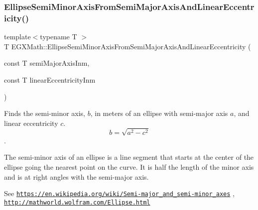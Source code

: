 \mbox{\label{group___e_g_x_math-_geometry-2_d-_ellipse-_semi_minor_axis_ga001beab4a083da9dd00dace28e749284}} 
\subsubsection{\texorpdfstring{Ellipse\+Semi\+Minor\+Axis\+From\+Semi\+Major\+Axis\+And\+Linear\+Eccentricity()}{EllipseSemiMinorAxisFromSemiMajorAxisAndLinearEccentricity()}}
{\footnotesize\ttfamily template$<$typename T $>$ \\
T E\+G\+X\+Math\+::\+Ellipse\+Semi\+Minor\+Axis\+From\+Semi\+Major\+Axis\+And\+Linear\+Eccentricity (\begin{DoxyParamCaption}\item[{const T}]{semi\+Major\+Axis\+Inm,  }\item[{const T}]{linear\+Eccentricity\+Inm }\end{DoxyParamCaption})}



Finds the semi-\/minor axis, $b$, in meters of an ellipse with semi-\/major axis $a$, and linear eccentricity $c$. \[ b=\sqrt{a^2-c^2} \]. 

The semi-\/minor axis of an ellipse is a line segment that starts at the center of the ellipse going the nearest point on the curve. It is half the length of the minor axis and is at right angles with the semi-\/major axis.

See \href{https://en.wikipedia.org/wiki/Semi-major_and_semi-minor_axes}{\tt https\+://en.\+wikipedia.\+org/wiki/\+Semi-\/major\+\_\+and\+\_\+semi-\/minor\+\_\+axes} , \href{http://mathworld.wolfram.com/Ellipse.html}{\tt http\+://mathworld.\+wolfram.\+com/\+Ellipse.\+html}


